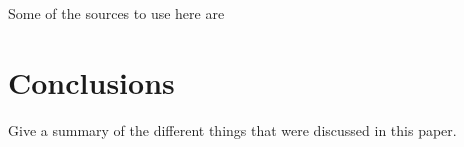 \documentclass[twoside,conference]{IEEEtran}
\begin{document}
		Some of the sources to use here are \cite{Lansford2013,Chang2013,Toyota2013,NTIA2013}

\section{Conclusions}\label{sec:conclusions}
	Give a summary of the different things that were discussed in this paper.



\end{document}
